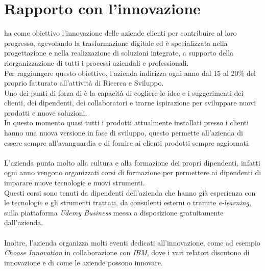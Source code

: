 \newpage
\section{Rapporto con l'innovazione}

{\azienda} ha come obiettivo l’innovazione delle aziende clienti per contribuire al loro progresso, 
agevolando la trasformazione digitale ed è specializzata nella progettazione e nella realizzazione di soluzioni integrate, 
a supporto della riorganizzazione di tutti i processi aziendali e professionali.\\
Per raggiungere questo obiettivo, l'azienda indirizza ogni anno dal 15 al 20\% del proprio fatturato all’attività di Ricerca e Sviluppo.\\
Uno dei punti di forza di {\azienda} è la capacità di cogliere le idee e i suggerimenti dei clienti, dei dipendenti, dei collaboratori e trarne ispirazione per sviluppare nuovi prodotti e nuove soluzioni.\\
In questo momento quasi tutti i prodotti attualmente installati presso i clienti hanno una nuova versione in fase di sviluppo,
questo permette all'azienda di essere sempre all'avanguardia e di fornire ai clienti prodotti sempre aggiornati.\\
\\
L'azienda punta molto alla cultura e alla formazione dei propri dipendenti, 
infatti ogni anno vengono organizzati corsi di formazione per permettere ai dipendenti di imparare nuove tecnologie e nuovi strumenti.\\
Questi corsi sono tenuti da dipendenti dell'azienda che hanno già esperienza con le tecnologie e gli strumenti trattati, da consulenti esterni 
o tramite \textit{e-learning}, sulla piattaforma \textit{Udemy Business} messa a disposizione gratuitamente dall'azienda.\\
\\
Inoltre, l'azienda organizza molti eventi dedicati all'innovazione, come ad esempio \textit{Choose Innovation} in collaborazione con \textit{IBM},
dove i vari relatori discutono di innovazione e di come le aziende possono innovare.\\